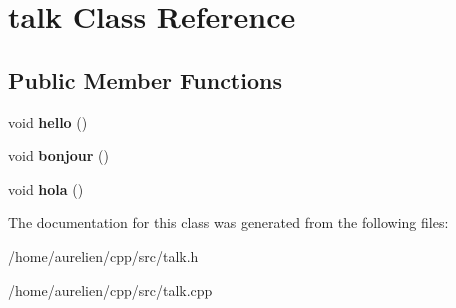 \hypertarget{classtalk}{}\section{talk Class Reference}
\label{classtalk}
\subsection*{Public Member Functions}
\begin{DoxyCompactItemize}
\item 
\mbox{\label{classtalk_ae585e254fa9691c052905f01cb317140}} 
void {\bfseries hello} ()
\item 
\mbox{\label{classtalk_a145c78c9234337d971349ccebb05ce1d}} 
void {\bfseries bonjour} ()
\item 
\mbox{\label{classtalk_a42c0d43e6206aabfb963dddc475c7a0f}} 
void {\bfseries hola} ()
\end{DoxyCompactItemize}


The documentation for this class was generated from the following files\+:\begin{DoxyCompactItemize}
\item 
/home/aurelien/cpp/src/talk.\+h\item 
/home/aurelien/cpp/src/talk.\+cpp\end{DoxyCompactItemize}
